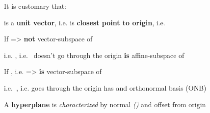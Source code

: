 \begin{itemize}

      \vItem
            It is customary that:

            \begin{itemize}

                  \vItem
                         is a \textbf{unit vector},
                        i.e. 
                  \vItem
                         is \textbf{closest point to origin},
                        i.e. 
            \end{itemize}
      \vItem
            If  =>
             \textbf{not} vector-subspace of 

            \begin{itemize}

                  \vItem
                        i.e. , i.e.~ doesn't go through the origin
                  \vItem
                         \textbf{is} affine-subspace of 
            \end{itemize}
      \vItem
            If ,
            i.e.  =>
             \textbf{is} vector-subspace of 

            \begin{itemize}

                  \vItem
                        i.e.~, i.e.  goes through the
                        origin
                  \vItem
                         has  and orthonormal basis (ONB)
            \end{itemize}
\end{itemize}

\hSep %

A \textbf{hyperplane}  is \emph{characterized} by normal 
\emph{()} and offset from origin 

